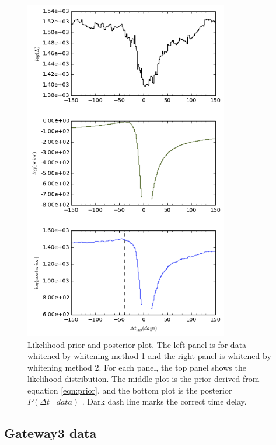 \documentclass[\docopts]{\docclass}
\begin{document}
\begin{figure}[!h]
\begin{minipage}[bottom]{0.4\textwidth}
\includegraphics[width=\textwidth, height=15cm, keepaspectratio]{whiten2/data2_full_log.png}
  \end{minipage}
 \caption{Likelihood prior and posterior plot. The left panel is for data whitened by whitening method 1 and the right panel is whitened by whitening method 2. For each panel, the top panel shows the likelihood distribution. The middle plot is the prior derived from equation \ref{eqn:prior}, and the bottom plot is the posterior $P(\Delta t \mid data)$ . Dark dash line marks the correct time delay. }
\end{figure}
\newpage

\subsection{Gateway3 data}
\end{document}
